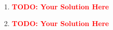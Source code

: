 \documentclass[12pt]{article}
\def\todo#1{\textcolor{red}{\textbf{#1}}}
\renewcommand{\|}{\mid}
\begin{document}
\begin{enumerate}
\begin{tcolorbox}
\begin{enumerate}
\item \todo{TODO: Your Solution Here}


\item \todo{TODO: Your Solution Here}




\end{enumerate}
\end{tcolorbox}
\end{enumerate}
\end{document}
